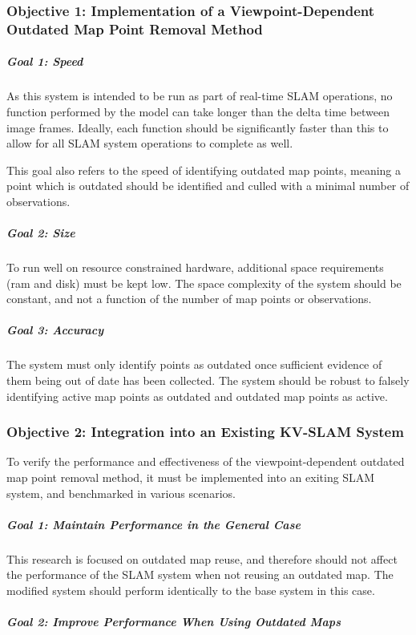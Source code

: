 \subsubsection*{Objective 1: Implementation of a Viewpoint-Dependent Outdated Map Point Removal Method}

\subparagraph{Goal 1: Speed}

As this system is intended to be run as part of real-time SLAM operations, no function performed by the model can take longer than the delta time between image frames. Ideally, each function should be significantly faster than this to allow for all SLAM system operations to complete as well.

This goal also refers to the speed of identifying outdated map points, meaning a point which is outdated should be identified and culled with a minimal number of observations.

\subparagraph{Goal 2: Size}

To run well on resource constrained hardware, additional space requirements (ram and disk) must be kept low. The space complexity of the system should be constant, and not a function of the number of map points or observations.

\subparagraph{Goal 3: Accuracy}

The system must only identify points as outdated once sufficient evidence of them being out of date has been collected. The system should be robust to falsely identifying active map points as outdated and outdated map points as active.

\subsubsection*{Objective 2: Integration into an Existing KV-SLAM System}

To verify the performance and effectiveness of the viewpoint-dependent outdated map point removal method, it must be implemented into an exiting SLAM system, and benchmarked in various scenarios.

\subparagraph{Goal 1: Maintain Performance in the General Case}

This research is focused on outdated map reuse, and therefore should not affect the performance of the SLAM system when not reusing an outdated map. The modified system should perform identically to the base system in this case.

\subparagraph{Goal 2: Improve Performance When Using Outdated Maps}


